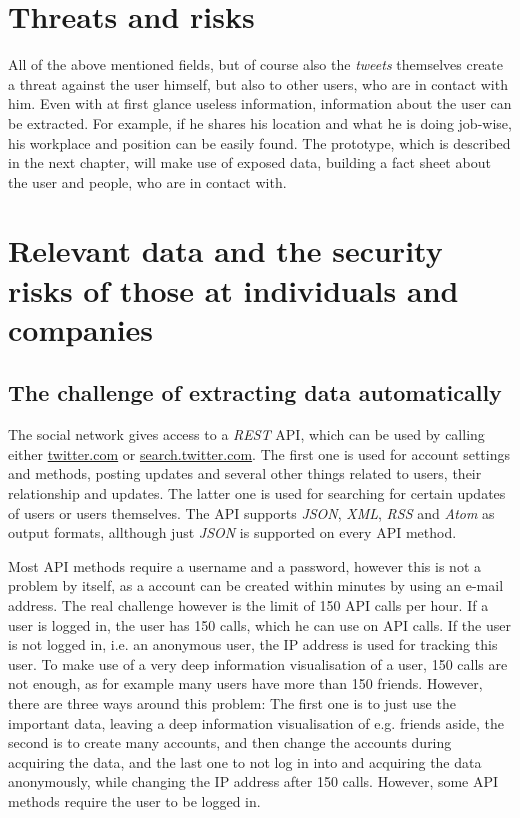\section{Threats and risks}

All of the above mentioned fields, but of course also the \textit{tweets}
themselves create a threat against the user himself, but also to other users,
who are in contact with him. Even with at first glance useless information,
information about the user can be extracted. For example, if he shares his
location and what he is doing job-wise, his workplace and position can be
easily found. The prototype, which is described in the next chapter, will make
use of exposed data, building a fact sheet about the user and people, who are
in contact with.

\section{Relevant data and the security risks of those at individuals and companies}
\label{sec:relevant_data}

\subsection{The challenge of extracting data automatically}

The \Twitter{} social network gives access to a \textit{REST} API, which can be
used by calling either \url{twitter.com} or \url{search.twitter.com}. The first
one is used for account settings and methods, posting updates and several other
things related to users, their relationship and updates. The latter one is used
for searching for certain updates of users or users themselves. The API
supports \textit{JSON}, \textit{XML}, \textit{RSS} and \textit{Atom} as output
formats, allthough just \textit{JSON} is supported on every API method.

Most API methods require a username and a password, however this is not a
problem by itself, as a \Twitter{} account can be created within minutes by
using an e-mail address. The real challenge however is the limit of 150 API calls
per hour. If a user is logged in, the user has 150 calls, which he can use on
API calls. If the user is not logged in, i.e. an anonymous user, the IP address
is used for tracking this user. To make use of a very deep information
visualisation of a user, 150 calls are not enough, as for example many users
have more than 150 friends. However, there are three ways around this problem:
The first one is to just use the important data, leaving a deep information
visualisation of e.g. friends aside, the second is to create many accounts, and
then change the accounts during acquiring the data, and the last one to not log
in into \Twitter{} and acquiring the data anonymously, while changing the IP
address after 150 calls. However, some API methods require the user to be
logged in.

